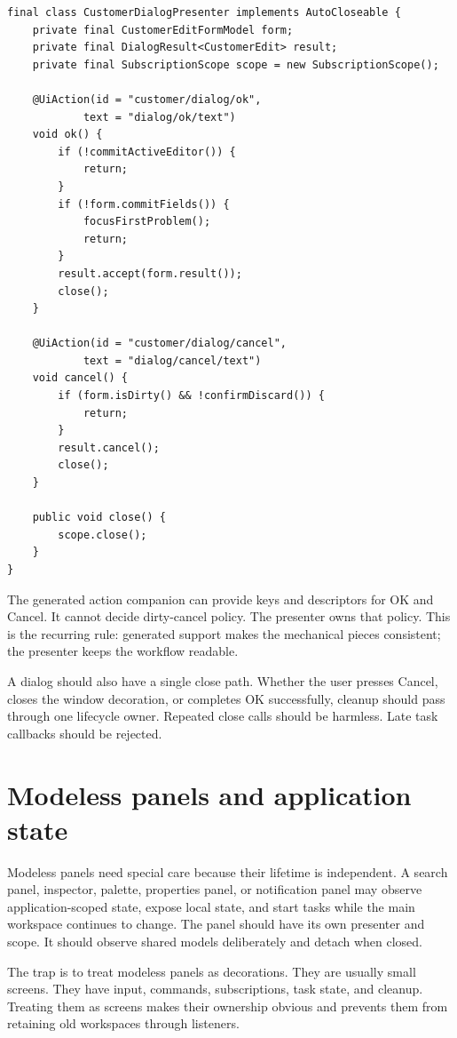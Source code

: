 \begin{lstlisting}[caption={OK is a workflow method, not a private button listener.}]
final class CustomerDialogPresenter implements AutoCloseable {
    private final CustomerEditFormModel form;
    private final DialogResult<CustomerEdit> result;
    private final SubscriptionScope scope = new SubscriptionScope();

    @UiAction(id = "customer/dialog/ok",
            text = "dialog/ok/text")
    void ok() {
        if (!commitActiveEditor()) {
            return;
        }
        if (!form.commitFields()) {
            focusFirstProblem();
            return;
        }
        result.accept(form.result());
        close();
    }

    @UiAction(id = "customer/dialog/cancel",
            text = "dialog/cancel/text")
    void cancel() {
        if (form.isDirty() && !confirmDiscard()) {
            return;
        }
        result.cancel();
        close();
    }

    public void close() {
        scope.close();
    }
}
\end{lstlisting}

The generated action companion can provide keys and descriptors for OK and Cancel. It cannot decide dirty-cancel policy. The presenter owns that policy. This is the recurring rule: generated support makes the mechanical pieces consistent; the presenter keeps the workflow readable.

A dialog should also have a single close path. Whether the user presses Cancel, closes the window decoration, or completes OK successfully, cleanup should pass through one lifecycle owner. Repeated close calls should be harmless. Late task callbacks should be rejected.

\section{Modeless panels and application state}

Modeless panels need special care because their lifetime is independent. A search panel, inspector, palette, properties panel, or notification panel may observe application-scoped state, expose local state, and start tasks while the main workspace continues to change. The panel should have its own presenter and scope. It should observe shared models deliberately and detach when closed.

The trap is to treat modeless panels as decorations. They are usually small screens. They have input, commands, subscriptions, task state, and cleanup. Treating them as screens makes their ownership obvious and prevents them from retaining old workspaces through listeners.

